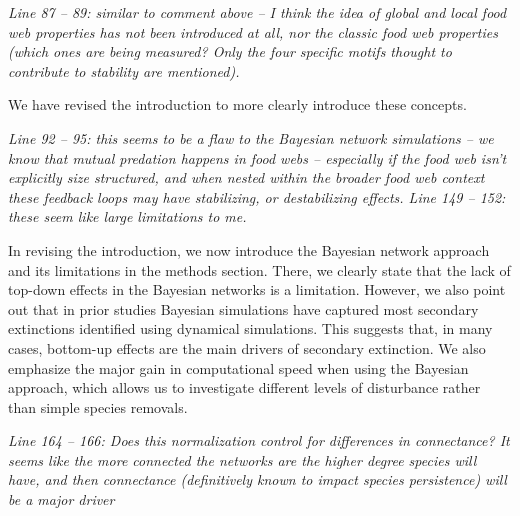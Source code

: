 \documentclass[12pt]{article}
\newcommand{\us}{\rm \setlength{\leftskip}{0.3cm} \setlength{\rightskip}{0.3cm}}
\newcommand{\them}{\it \setlength{\leftskip}{0cm} \setlength{\rightskip}{0cm}}
\begin{document}
        
        
        \them
        Line 87 – 89: similar to comment above – I think the idea of global and local food web properties has not been introduced at all, nor the classic food web properties (which ones are being measured? Only the four specific motifs thought to contribute to stability are mentioned).
        
        \us We have revised the introduction to more clearly introduce these concepts. 
        
        \them
        Line 92 – 95: this seems to be a flaw to the Bayesian network simulations – we know that mutual predation happens in food webs – especially if the food web isn’t explicitly size structured, and when nested within the broader food web context these feedback loops may have stabilizing, or destabilizing effects.
        \smallskip
        Line 149 – 152: these seem like large limitations to me.
        
        
        \us In revising the introduction, we now introduce the Bayesian network approach and its limitations in the methods section. There, we clearly state that the lack of top-down effects in the Bayesian networks is a limitation. However, we also point out that in prior studies Bayesian simulations have captured most secondary extinctions identified using dynamical simulations. This suggests that, in many cases, bottom-up effects are the main drivers of secondary extinction. We also emphasize the major gain in computational speed when using the Bayesian approach, which allows us to investigate different levels of disturbance rather than simple species removals.
        
        \them
        Line 164 – 166: Does this normalization control for differences in connectance? It seems like the more connected the networks are the higher degree species will have, and then connectance (definitively known to impact species persistence) will be a major driver
        
\end{document}
